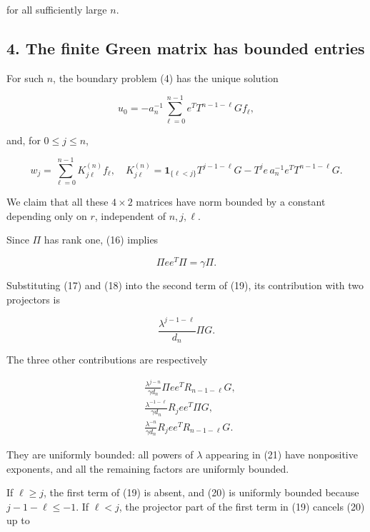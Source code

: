 \documentclass[10pt,a4paper]{article}
\begin{document}
for all sufficiently large \(n\).

\subsection{4. The finite Green matrix has bounded
entries}\label{the-finite-green-matrix-has-bounded-entries}

For such \(n\), the boundary problem (4) has the unique solution

\nopagebreak[4]

\[
u_0=-a_n^{-1}\sum_{\ell=0}^{n-1}e^TT^{n-1-\ell}Gf_\ell,
\]

and, for \(0\le j\le n\),

\nopagebreak[4]

\[
w_j=\sum_{\ell=0}^{n-1}K_{j\ell}^{(n)}f_\ell,
\quad
K_{j\ell}^{(n)}=
\mathbf 1_{\{\ell<j\}}T^{j-1-\ell}G
-T^je\,a_n^{-1}e^TT^{n-1-\ell}G.
\tag{19}
\]

We claim that all these \(4\times2\) matrices have norm bounded by a
constant depending only on \(r\), independent of \(n,j,\ell\).


Since \(\Pi\) has rank one, (16) implies

\nopagebreak[4]

\[
\Pi e e^T\Pi=\gamma\Pi.
\]

Substituting (17) and (18) into the second term of (19), its
contribution with two projectors is

\nopagebreak[4]

\[
\frac{\lambda^{j-1-\ell}}{d_n}\Pi G.
\tag{20}
\]

The three other contributions are respectively

\nopagebreak[4]

\[
\begin{aligned}
&\frac{\lambda^{j-n}}{\gamma d_n}\Pi e e^TR_{n-1-\ell}G,\\
&\frac{\lambda^{-1-\ell}}{\gamma d_n}R_je e^T\Pi G,\\
&\frac{\lambda^{-n}}{\gamma d_n}R_je e^TR_{n-1-\ell}G.
\end{aligned}
\tag{21}
\]

They are uniformly bounded: all powers of \(\lambda\) appearing in (21)
have nonpositive exponents, and all the remaining factors are uniformly
bounded.

If \(\ell\ge j\), the first term of (19) is absent, and (20) is
uniformly bounded because \(j-1-\ell\le-1\). If \(\ell<j\), the
projector part of the first term in (19) cancels (20) up to
\end{document}
